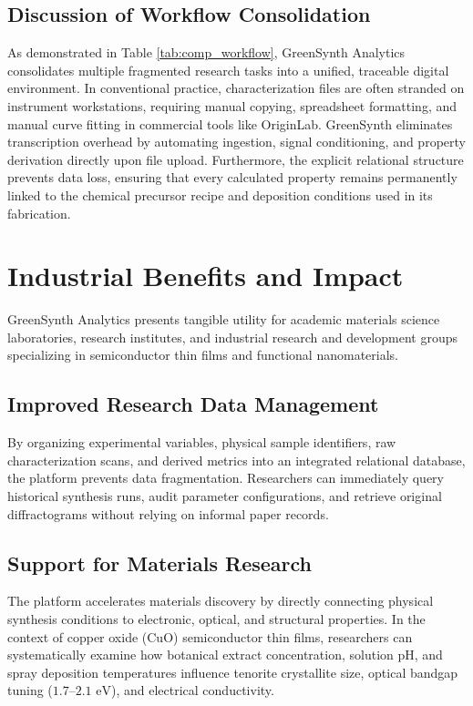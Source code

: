 \documentclass[12pt,a4paper,oneside]{report}
\begin{document}
{{{\subsection{Discussion of Workflow Consolidation}

As demonstrated in Table \ref{tab:comp_workflow}, GreenSynth Analytics consolidates multiple fragmented research tasks into a unified, traceable digital environment. In conventional practice, characterization files are often stranded on instrument workstations, requiring manual copying, spreadsheet formatting, and manual curve fitting in commercial tools like OriginLab. GreenSynth eliminates transcription overhead by automating ingestion, signal conditioning, and property derivation directly upon file upload. Furthermore, the explicit relational structure prevents data loss, ensuring that every calculated property remains permanently linked to the chemical precursor recipe and deposition conditions used in its fabrication.

\clearpage
\section{Industrial Benefits and Impact}

GreenSynth Analytics presents tangible utility for academic materials science laboratories, research institutes, and industrial research and development groups specializing in semiconductor thin films and functional nanomaterials.

\subsection{Improved Research Data Management}
By organizing experimental variables, physical sample identifiers, raw characterization scans, and derived metrics into an integrated relational database, the platform prevents data fragmentation. Researchers can immediately query historical synthesis runs, audit parameter configurations, and retrieve original diffractograms without relying on informal paper records.

\subsection{Support for Materials Research}
The platform accelerates materials discovery by directly connecting physical synthesis conditions to electronic, optical, and structural properties. In the context of copper oxide ($\text{CuO}$) semiconductor thin films, researchers can systematically examine how botanical extract concentration, solution pH, and spray deposition temperatures influence tenorite crystallite size, optical bandgap tuning ($1.7\text{--}2.1\text{ eV}$), and electrical conductivity.

}}}
\end{document}
